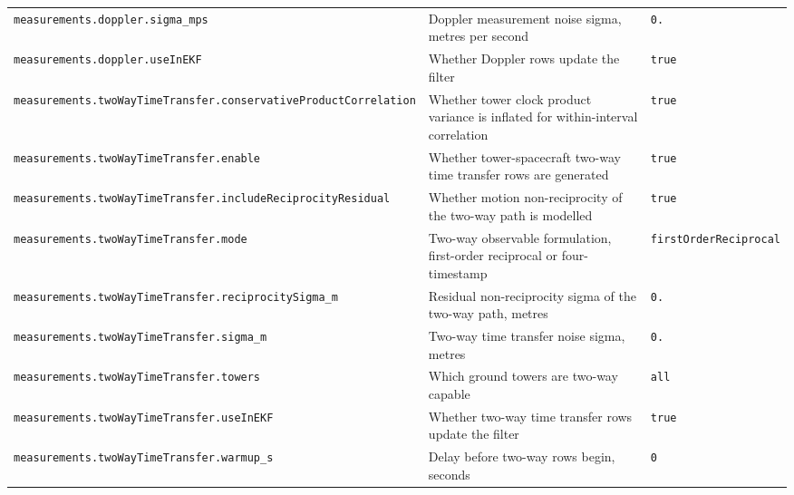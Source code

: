 \begin{center}
\begin{longtable}{>{\raggedright\arraybackslash\scriptsize\ttfamily}p{}|>{\raggedright\arraybackslash}p{}|>{\raggedright\arraybackslash\scriptsize\ttfamily}p{}}
\texttt{measurements.\allowbreak doppler.\allowbreak sigma\_\allowbreak mps} & Doppler measurement noise sigma, metres per second & \texttt{0.\allowbreak 0424} \\
\texttt{measurements.\allowbreak doppler.\allowbreak use\allowbreak In\allowbreak EKF} & Whether Doppler rows update the filter & \texttt{true} \\
\texttt{measurements.\allowbreak two\allowbreak Way\allowbreak Time\allowbreak Transfer.\allowbreak conservative\allowbreak Product\allowbreak Correlation} & Whether tower clock product variance is inflated for within-interval correlation & \texttt{true} \\
\texttt{measurements.\allowbreak two\allowbreak Way\allowbreak Time\allowbreak Transfer.\allowbreak enable} & Whether tower-spacecraft two-way time transfer rows are generated & \texttt{true} \\
\texttt{measurements.\allowbreak two\allowbreak Way\allowbreak Time\allowbreak Transfer.\allowbreak include\allowbreak Reciprocity\allowbreak Residual} & Whether motion non-reciprocity of the two-way path is modelled & \texttt{true} \\
\texttt{measurements.\allowbreak two\allowbreak Way\allowbreak Time\allowbreak Transfer.\allowbreak mode} & Two-way observable formulation, first-order reciprocal or four-timestamp & \texttt{first\allowbreak Order\allowbreak Reciprocal} \\
\texttt{measurements.\allowbreak two\allowbreak Way\allowbreak Time\allowbreak Transfer.\allowbreak reciprocity\allowbreak Sigma\_\allowbreak m} & Residual non-reciprocity sigma of the two-way path, metres & \texttt{0.\allowbreak 005} \\
\texttt{measurements.\allowbreak two\allowbreak Way\allowbreak Time\allowbreak Transfer.\allowbreak sigma\_\allowbreak m} & Two-way time transfer noise sigma, metres & \texttt{0.\allowbreak 03} \\
\texttt{measurements.\allowbreak two\allowbreak Way\allowbreak Time\allowbreak Transfer.\allowbreak towers} & Which ground towers are two-way capable & \texttt{all} \\
\texttt{measurements.\allowbreak two\allowbreak Way\allowbreak Time\allowbreak Transfer.\allowbreak use\allowbreak In\allowbreak EKF} & Whether two-way time transfer rows update the filter & \texttt{true} \\
\texttt{measurements.\allowbreak two\allowbreak Way\allowbreak Time\allowbreak Transfer.\allowbreak warmup\_\allowbreak s} & Delay before two-way rows begin, seconds & \texttt{0} \\

\end{longtable}
\end{center}
